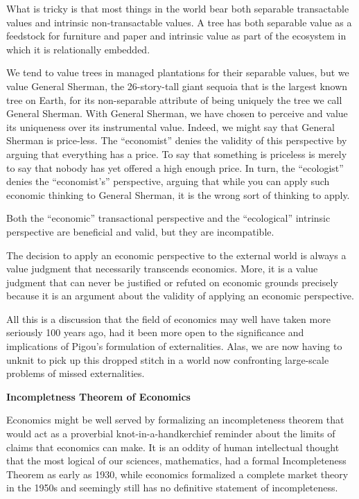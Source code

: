 \documentclass[
]{book}
\begin{document}
What is tricky is that most things in the world bear both separable transactable values and
intrinsic non-transactable values. A tree has both separable value as a feedstock for furniture
and paper and intrinsic value as part of the ecosystem in which it is relationally embedded.

We tend to value trees in managed plantations for their separable values, but we value
General Sherman, the 26-story-tall giant sequoia that is the largest known tree on Earth, for
its non-separable attribute of being uniquely the tree we call General Sherman.
With General Sherman, we have chosen to perceive and value its uniqueness over its
instrumental value. Indeed, we might say that General Sherman is price-less. The
``economist'' denies the validity of this perspective by arguing that everything has a price. To
say that something is priceless is merely to say that nobody has yet offered a high enough
price.
In turn, the ``ecologist'' denies the ``economist's'' perspective, arguing that while you can apply
such economic thinking to General Sherman, it is the wrong sort of thinking to apply.

Both the ``economic'' transactional perspective and the ``ecological'' intrinsic perspective are
beneficial and valid, but they are incompatible.

The decision to
apply an economic perspective to the external world is always a value judgment that
necessarily transcends economics. More, it is a value judgment that can never be justified or
refuted on economic grounds precisely because it is an argument about the validity of
applying an economic perspective.

All this is a discussion that the field of economics may well have taken more seriously 100
years ago, had it been more open to the significance and implications of Pigou's formulation
of externalities. Alas, we are now having to unknit to pick up this dropped stitch in a world now
confronting large-scale problems of missed externalities.

\textbf{Incompletness Theorem of Economics}

Economics might be well served by formalizing an incompleteness theorem that would act as
a proverbial knot-in-a-handkerchief reminder about the limits of claims that economics can
make. It is an oddity of human intellectual thought that the most logical of our sciences,
mathematics, had a formal Incompleteness Theorem as early as 1930, while economics
formalized a complete market theory in the 1950s and seemingly still has no definitive
statement of incompleteness.
\end{document}
